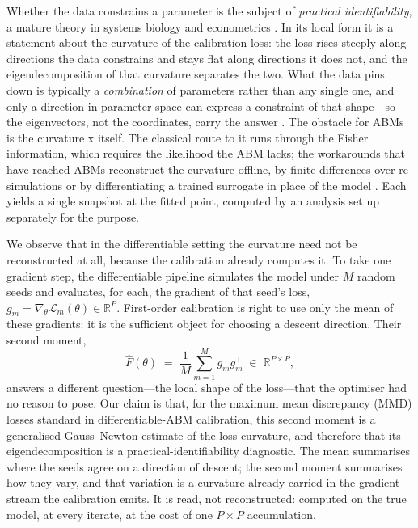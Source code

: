 \documentclass[10pt,twocolumn]{article}
\newcommand{\R}{\mathbb{R}}
\newcommand{\Fhat}{\hat{F}}
\newcommand{\Ltot}{\mathcal{L}}
\begin{document}
Whether the data constrains a parameter is the subject of \emph{practical
identifiability}, a mature theory in systems biology and econometrics
\citep{raue2009structural, rothenberg1971identification}. In its local form it is a
statement about the curvature of the calibration loss: the loss rises steeply along
directions the data constrains and stays flat along directions it does not, and the
eigendecomposition of that curvature separates the two. What the data pins down is
typically a \emph{combination} of parameters rather than any single one, and only a
direction in parameter space can express a constraint of that shape---so the
eigenvectors, not the coordinates, carry the answer \citep{gutenkunst2007universally,
transtrum2011geometry}. The obstacle for ABMs is the curvature x itself. The
classical route to it runs through the Fisher information, which requires the
likelihood the ABM lacks; the workarounds that have reached ABMs reconstruct the
curvature offline, by finite differences over re-simulations
\citep{naumann2024exploration} or by differentiating a trained surrogate in place of
the model \citep{scarrold2024computing}. Each yields a single snapshot at the fitted
point, computed by an analysis set up separately for the purpose.

We observe that in the differentiable setting the curvature need not be
reconstructed at all, because the calibration already computes it. To take one
gradient step, the differentiable pipeline simulates the model under $M$ random
seeds and evaluates, for each, the gradient of that seed's loss,
$g_m = \nabla_\theta \Ltot_m(\theta) \in \R^P$. First-order calibration is right to
use only the mean of these gradients: it is the sufficient object for choosing a
descent direction. Their second moment,
\begin{equation}
  \Fhat(\theta) \;=\; \frac{1}{M}\sum_{m=1}^{M} g_m g_m^\top \;\in\; \R^{P\times P},
  \label{eq:Fhat-intro}
\end{equation}
answers a different question---the local shape of the loss---that the optimiser had
no reason to pose. Our claim is that, for the maximum mean discrepancy (MMD) losses
standard in differentiable-ABM calibration, this second moment is a generalised
Gauss--Newton estimate of the loss curvature, and therefore that its
eigendecomposition is a practical-identifiability diagnostic. The mean summarises
where the seeds agree on a direction of descent; the second moment summarises how
they vary, and that variation is a curvature already carried in the gradient stream
the calibration emits. It is read, not reconstructed: computed on the true model,
at every iterate, at the cost of one $P\times P$ accumulation.
\end{document}
